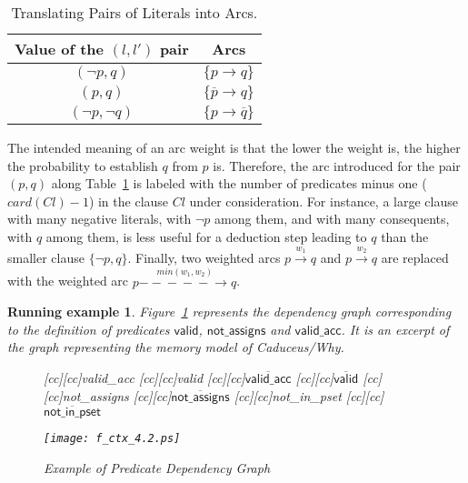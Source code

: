 \documentclass{acm_proc_article-sp}
\theoremstyle{nonumberplain}
\newtheorem{xpl}{Running example}}
\newcommand{\clause}{\mathit{Cl}}
\newcommand{\valid}[0]{\ensuremath{\mathsf{valid}}}
\newcommand{\notassigns}[0]{\ensuremath{\mathsf{not\_assigns}}}
\newcommand{\validacc}[0]{\ensuremath{\mathsf{valid\_acc}}}
\begin{document}
\begin{table}[hbt!]
\begin{center}
\begin{tabular}{@{~~~}c@{~~~}|@{~~~}c@{~~~}}
Value of the $(l,l')$ pair & Arcs \\
\hline
\hline
\( (\neg p,q) \) & $\{p \longrightarrow  q\}$ \\  
\( (p,q) \) & $\{\overline{p} \longrightarrow q \}$ \\ 
\( (\neg p,\neg q)\) & $\{p \longrightarrow \overline{q}\}$  
\end{tabular}
\end{center}
\caption{Translating Pairs of Literals into Arcs.}\label{table:edge}
\end{table}


The intended meaning of an arc weight is that the lower the weight is,
the higher the probability to establish \(q\) from \(p\) is. Therefore,
the arc introduced for the pair \((p,q)\) along Table~\ref{table:edge}
is labeled with the number of predicates minus one (\(card(\clause) -
1\)) in the clause $\clause$ under consideration. For instance, a large
clause with many negative literals, with $\neg p$ among them, and with
many consequents, with $q$ among them, is less useful for a deduction
step leading to \(q\) than the smaller clause \(\{\neg p, q \}\).
Finally, two weighted arcs $p \overset{w_1}{\longrightarrow} q$ and $p
\overset{w_2}{\longrightarrow} q$ are replaced with the weighted arc $p
\overset{min(w_1,w_2)}{-\!\!\!-\!\!\!-\!\!\!-\!\!\!-\!\!\!\longrightarrow} 
q$.



\begin{xpl}
Figure~\ref{fig:dep_graph_axiom} represents the dependency graph
corresponding to the definition of predicates $\valid$, $\notassigns$ and $\validacc$.
It is an excerpt of the graph representing the memory model of
Caduceus/Why.



\begin{figure}
\label{fig:not_assign_dep}
\begin{center}
[cc][cc]{\textsf{valid\_acc}}
[cc][cc]{\textsf{valid}}
[cc][cc]{$\overline{\textsf{valid\_acc}}$}
[cc][cc]{$\overline{\textsf{valid}}$}
[cc][cc]{\textsf{not\_assigns}}
[cc][cc]{$\overline{\textsf{not\_assigns}}$}
[cc][cc]{\textsf{not\_in\_pset}}
[cc][cc]{$\overline{\textsf{not\_in\_pset}}$}

\texttt{[image: f\_ctx\_4.2.ps]}
\end{center}
\caption{Example of Predicate Dependency Graph
\label{fig:dep_graph_axiom}}
\end{figure}
\end{xpl}
\end{document}
